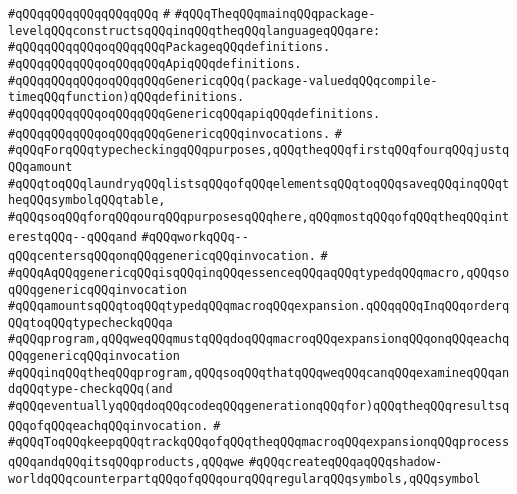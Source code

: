\verb|#qQQqqQQqqQQqqQQqqQQq|\newline
\verb|#|\newline
\verb|#qQQqTheqQQqmainqQQqpackage-levelqQQqconstructsqQQqinqQQqtheqQQqlanguageqQQqare:|\newline
\verb|#qQQqqQQqqQQqoqQQqqQQqPackageqQQqdefinitions.|\newline
\verb|#qQQqqQQqqQQqoqQQqqQQqApiqQQqdefinitions.|\newline
\verb|#qQQqqQQqqQQqoqQQqqQQqGenericqQQq(package-valuedqQQqcompile-timeqQQqfunction)qQQqdefinitions.|\newline
\verb|#qQQqqQQqqQQqoqQQqqQQqGenericqQQqapiqQQqdefinitions.|\newline
\verb|#qQQqqQQqqQQqoqQQqqQQqGenericqQQqinvocations.|\newline
\verb|#|\newline
\verb|#qQQqForqQQqtypecheckingqQQqpurposes,qQQqtheqQQqfirstqQQqfourqQQqjustqQQqamount|\newline
\verb|#qQQqtoqQQqlaundryqQQqlistsqQQqofqQQqelementsqQQqtoqQQqsaveqQQqinqQQqtheqQQqsymbolqQQqtable,|\newline
\verb|#qQQqsoqQQqforqQQqourqQQqpurposesqQQqhere,qQQqmostqQQqofqQQqtheqQQqinterestqQQq--qQQqand|\newline
\verb|#qQQqworkqQQq--qQQqcentersqQQqonqQQqgenericqQQqinvocation.|\newline
\verb|#|\newline
\verb|#qQQqAqQQqgenericqQQqisqQQqinqQQqessenceqQQqaqQQqtypedqQQqmacro,qQQqsoqQQqgenericqQQqinvocation|\newline
\verb|#qQQqamountsqQQqtoqQQqtypedqQQqmacroqQQqexpansion.qQQqqQQqInqQQqorderqQQqtoqQQqtypecheckqQQqa|\newline
\verb|#qQQqprogram,qQQqweqQQqmustqQQqdoqQQqmacroqQQqexpansionqQQqonqQQqeachqQQqgenericqQQqinvocation|\newline
\verb|#qQQqinqQQqtheqQQqprogram,qQQqsoqQQqthatqQQqweqQQqcanqQQqexamineqQQqandqQQqtype-checkqQQq(and|\newline
\verb|#qQQqeventuallyqQQqdoqQQqcodeqQQqgenerationqQQqfor)qQQqtheqQQqresultsqQQqofqQQqeachqQQqinvocation.|\newline
\verb|#|\newline
\verb|#qQQqToqQQqkeepqQQqtrackqQQqofqQQqtheqQQqmacroqQQqexpansionqQQqprocessqQQqandqQQqitsqQQqproducts,qQQqwe|\newline
\verb|#qQQqcreateqQQqaqQQqshadow-worldqQQqcounterpartqQQqofqQQqourqQQqregularqQQqsymbols,qQQqsymbol|\newline
